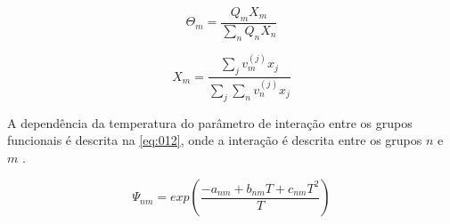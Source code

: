 \begin{equation}\label{eq:010}
\Theta_m = \frac{Q_mX_m}{\displaystyle\sum_nQ_nX_n}
\end{equation}

\begin{equation}\label{eq:011}
X_m =
\frac{\displaystyle\sum_jv^{(j)}_mx_j}{\displaystyle\sum_j\sum_nv_n^{(j)}x_j}
\end{equation}

A dependência da temperatura do parâmetro de interação entre os grupos
funcionais é descrita na \autoref{eq:012}, onde a interação é descrita entre os
grupos $n$ e $m$ .

\begin{equation}\label{eq:012}
\Psi_{nm} = exp \left ( \frac{-a_{nm} + b_{nm}T + c_{nm}T^2}{T} \right)
\end{equation}



